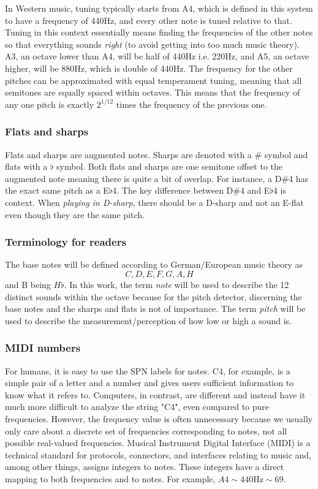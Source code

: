 In Western music, tuning typically starts from A4, which is defined in this system to have a frequency of 440Hz, and every other note is tuned relative to that. Tuning in this context essentially means finding the frequencies of the other notes so that everything sounds \textit{right} (to avoid getting into too much music theory). A3, an octave lower than A4, will be half of 440Hz i.e. 220Hz, and A5, an octave higher, will be 880Hz, which is double of 440Hz. The frequency for the other pitches can be approximated with equal temperament tuning, meaning that all semitones are equally spaced within octaves. This means that the frequency of any one pitch is exactly $2^{1/12}$ times the frequency of the previous one.  

\subsubsection{Flats and sharps}
Flats and sharps are augmented notes. Sharps are denoted with a $\#$ symbol and flats with a $\flat$ symbol. Both flats and sharps are one semitone offset to the augmented note meaning there is quite a bit of overlap. For instance, a D$\#$4 has the exact same pitch as a E$\flat$4. The key difference between D$\#$4 and E$\flat$4 is context. When \textit{playing in D-sharp}, there should be a D-sharp and not an E-flat even though they are the same pitch.

\subsubsection{Terminology for readers}
The base notes will be defined according to German/European music theory as \[C, D, E, F, G, A, H\] and B being $H\flat$. In this work, the term \textit{note} will be used to describe the 12 distinct sounds within the octave because for the pitch detector, discerning the base notes and the sharps and flats is not of importance. The term \textit{pitch} will be used to describe the measurement/perception of how low or high a sound is.

\subsubsection{MIDI numbers}
For humans, it is easy to use the SPN labels for notes. C4, for example, is a simple pair of a letter and a number and gives users sufficient information to know what it refers to. Computers, in contrast, are different and instead have it much more difficult to analyze the string "C4", even compared to pure frequencies. However, the frequency value is often unnecessary because we usually only care about a discrete set of frequencies corresponding to notes, not all possible real-valued frequencies. Musical Instrument Digital Interface (MIDI) is a technical standard for protocols, connectors, and interfaces relating to music and, among other things, assigns integers to notes. These integers have a direct mapping to both frequencies and to notes. For example, $A4 \sim 440\mathrm{Hz} \sim 69$.


